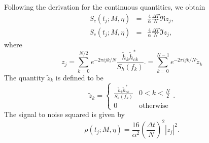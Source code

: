 Following the derivation for the continuous quantities, we obtain
\begin{eqnarray}
S_c(t_j;M,\eta) &=& \frac{4}{\alpha} \frac{\Delta T}{N} \Re z_j, \\
S_c(t_j;M,\eta) &=& \frac{4}{\alpha} \frac{\Delta T}{N} \Im z_j,
\end{eqnarray}
where
\begin{equation}
z_j = \sum_{k=0}^{N/2} e^{-2\pi ijk/N} 
\frac{\tilde{h}_k \tilde{h}^\ast_{ck}}{S_h(f_k)}.
  = \sum_{k=0}^{N-1} e^{-2\pi ijk/N} \tilde{z}_k
\end{equation}
The quantity $\tilde{z}_k$ is defined to be
\begin{equation}
  \tilde{z}_k = \left\{
    \begin{array}{ll}
      \frac{\tilde{h}_k \tilde{h}^\ast_{ck}}{S_h(f_k)} & 0 < k < \frac{N}{2} \\
       0 & \textrm{otherwise}
    \end{array}
  \right. .
\end{equation}
The signal to noise squared is given by
\begin{equation}
\rho(t_j;M,\eta) = \frac{16}{\alpha^2} \left(\frac{\Delta t}{N}\right)^2
  \left| z_j \right|^2.
\end{equation}

